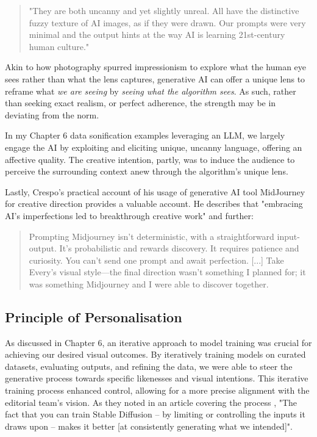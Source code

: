 \begin{quote}
"They are both uncanny and yet slightly unreal. All have the distinctive fuzzy texture of AI images, as if they were drawn. Our prompts were very minimal and the output hints at the way AI is learning 21st-century human culture."
\end{quote}

Akin to how photography spurred impressionism to explore what the human eye sees rather than what the lens captures, generative AI can offer a unique lens to reframe what \textit{we are seeing} by \textit{seeing what the algorithm sees}. As such, rather than seeking exact realism, or perfect adherence, the strength may be in deviating from the norm. 

In my Chapter 6 data sonification examples leveraging an LLM, we largely engage the AI by exploiting and eliciting unique, uncanny language, offering an affective quality. The creative intention, partly, was to induce the audience to perceive the surrounding context anew through the algorithm's unique lens.

Lastly, Crespo's practical account of his usage of generative AI tool MidJourney for creative direction provides a valuable account. He describes that "embracing AI's imperfections led to breakthrough creative work" and further: 

\begin{quote}
Prompting Midjourney isn't deterministic, with a straightforward input-output. It's probabilistic and rewards discovery. It requires patience and curiosity. You can't send one prompt and await perfection. 
[...]
Take Every’s visual style—the final direction wasn’t something I planned for; it was something Midjourney and I were able to discover together.
\end{quote} \cite{Crespo2022-ty}


\subsection{Principle of Personalisation}

 As discussed in Chapter 6, an iterative approach to model training was crucial for achieving our desired visual outcomes. By iteratively training models on curated datasets, evaluating outputs, and refining the data, we were able to steer the generative process towards specific likenesses and visual intentions. This iterative training process enhanced control, allowing for a more precise alignment with the editorial team's vision. As they noted in an article covering the process \cite{Drummond2023-bh}, "The fact that you can train Stable Diffusion – by limiting or controlling the inputs it draws upon – makes it better [at consistently generating what we intended]".

